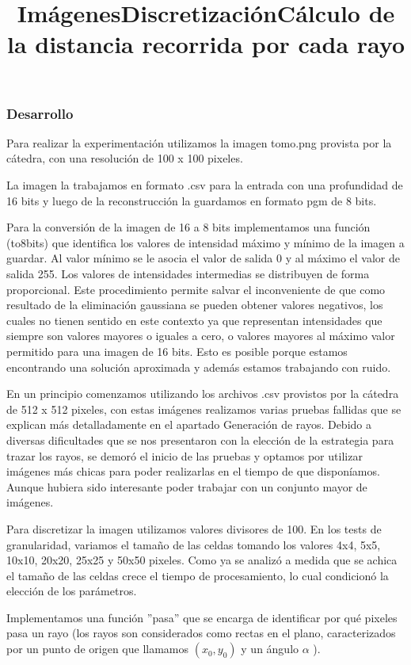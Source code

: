 \subsubsection*{Desarrollo}

\title {Imágenes}

\par Para realizar la experimentación utilizamos la imagen tomo.png provista por la cátedra, con una resolución de 100 x 100 pixeles.
\par La imagen la trabajamos en formato .csv para la entrada con una profundidad de 16 bits y luego de la reconstrucción la guardamos en formato pgm de 8 bits.
\par Para la conversión de la imagen de 16 a 8 bits implementamos una función (to8bits) que identifica los valores de intensidad máximo y mínimo de la imagen a guardar. Al valor mínimo se le asocia el valor de salida 0 y al máximo el valor de salida 255. Los valores de intensidades intermedias se distribuyen de forma proporcional. Este procedimiento permite salvar el inconveniente de que como resultado de la eliminación gaussiana se pueden obtener valores negativos, los cuales no tienen sentido en este contexto ya que representan intensidades que siempre son valores mayores o iguales a cero, o valores mayores al máximo valor permitido para una imagen de 16 bits. Esto es posible porque estamos encontrando una solución aproximada y además estamos trabajando con ruido.

\par En un principio comenzamos utilizando los archivos .csv provistos por la cátedra de 512 x 512 pixeles, con estas imágenes realizamos varias pruebas fallidas que se explican más detalladamente en el apartado Generación de rayos. Debido a diversas dificultades que se nos presentaron con la elección de la estrategia para trazar los rayos, se demoró el inicio de las pruebas y optamos por utilizar imágenes más chicas para poder realizarlas en el tiempo de que disponíamos. Aunque hubiera sido interesante poder trabajar con un conjunto mayor de imágenes.

\title {Discretización} Para discretizar la imagen utilizamos valores divisores de 100. En los tests de granularidad, variamos el tamaño de las celdas tomando los valores 4x4, 5x5, 10x10, 20x20, 25x25 y 50x50 pixeles. Como ya se analizó a medida que se achica el tamaño de las celdas crece el tiempo de procesamiento, lo cual condicionó la elección de los parámetros.

\title {Cálculo de la distancia recorrida por cada rayo} 
Implementamos una función ''pasa'' que se encarga de identificar por qué pixeles pasa un rayo (los rayos son considerados como rectas en el plano, caracterizados por un punto de origen que llamamos $(x_{0},y_{0})$ y un ángulo $\alpha$ ).

